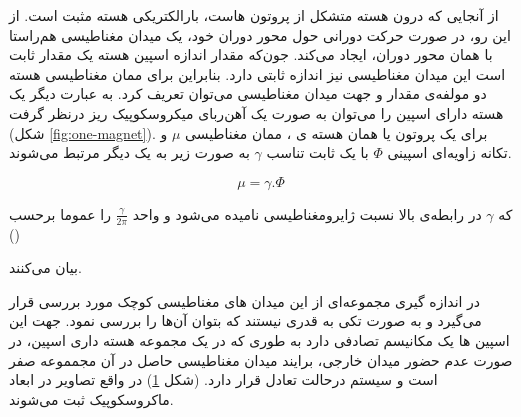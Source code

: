 از آنجایی که درون هسته متشکل از پروتون هاست، بارالکتریکی هسته مثبت است. از این رو، در صورت حرکت دورانی حول محور دوران خود، یک میدان مغناطیسی هم‌راستا با همان محور دوران، ایجاد می‌کند. جون‌که مقدار اندازه اسپین هسته یک مقدار ثابت است این میدان مغناطیسی نیز اندازه ثابتی دارد. بنابراین برای ممان مغناطیسی هسته
دو مولفه‌ی مقدار و جهت میدان مغناطیسی می‌توان تعریف کرد. به عبارت دیگر یک هسته دارای اسپین را می‌توان به صورت یک آهن‌ربای میکروسکوپیک ریز درنظر گرفت
(شکل \ref{fig:one-magnet}).
برای یک پروتون یا همان هسته ی ، ممان مغناطیسی $\mu$ و تکانه زاویه‌ای اسپینی
$\Phi$
با یک ثابت تناسب $\gamma$ به صورت زیر به یک دیگر مرتبط می‌شوند.

\begin{equation}
	\mu = \gamma . \Phi
\end{equation}

که $\gamma$ در رابطه‌ی بالا نسبت ژایرومغناطیسی 
نامیده می‌شود و واحد  $\frac{\gamma}{2\pi}$
را عموما برحسب ()

بیان می‌کنند.



\begin{figure}[t]
	\centering
	\caption{}
	\label{fig:balance-spin}
\end{figure}


در اندازه گیری \mr مجموعه‌ای از این میدان های مغناطیسی کوچک مورد بررسی قرار می‌گیرد و به صورت تکی به قدری نیستند که بتوان آن‌ها را بررسی نمود. جهت این اسپین ها یک مکانیسم تصادفی دارد به طوری که در یک مجموعه هسته داری اسپین، در صورت عدم حضور میدان خارجی، برایند میدان مغناطیسی حاصل در آن مجمموعه صفر است و سیستم درحالت تعادل قرار دارد. 
(شکل \ref{fig:balance-spin}) در واقع تصاویر \mri در ابعاد ماکروسکوپیک ثبت می‌شوند.



